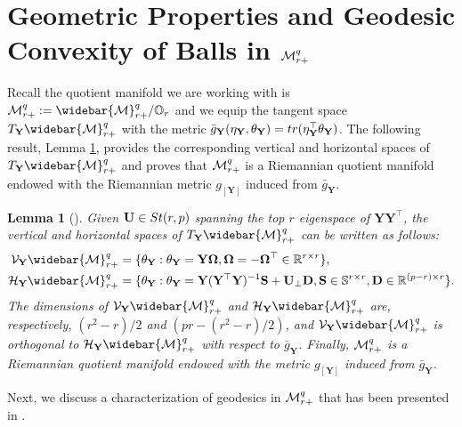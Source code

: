\documentclass[11pt]{article}
\newtheorem{Lemma}{Lemma}
\newcommand{\bbR}{\mathbb{R}}
\newcommand{\bbS}{\mathbb{S}}
\newcommand{\cV}{\mathcal{V}}
\newcommand{\cH}{\mathcal{H}}
\newcommand{\0}{{\mathbf{0}}}
\newcommand{\1}{{\mathbf{1}}}
\newcommand{\D}{{\mathbf{D}}}
\renewcommand{\S}{{\mathbf{S}}}
\newcommand{\U}{{\mathbf{U}}}
\newcommand{\Y}{{\mathbf{Y}}}
\newcommand{\cM}{{\cal M}}
\newcommand{\bOmega}{\boldsymbol{\Omega}}
\newcommand{\tr}{{\rm tr}}
\newcommand{\st}{{\rm St}}
\newcommand{\bbO}{\mathbb{O}}
\begin{document}
\section{Geometric Properties and Geodesic Convexity of Balls in $\cM_{r+}^q$ } \label{sec: quotient-fixed-rank-matrix}
Recall the quotient manifold we are working with is $\cM_{r+}^{q} := \widebar{\cM}_{r+}^{q}/\bbO_r$ and we equip the tangent space $T_\Y \widebar{\cM}_{r+}^{q}$ with the metric $\bar{g}_\Y(\eta_\Y, \theta_\Y)= \tr(\eta_\Y^\top \theta_\Y)$. The following result, Lemma \ref{lm: psd-quotient-manifold1-prop}, provides the corresponding vertical and horizontal spaces of $T_\Y \widebar{\cM}_{r+}^{q}$ and proves that $\cM_{r+}^{q}$ is a Riemannian quotient manifold endowed with the Riemannian metric $g_{[\Y]}$ induced from $\bar{g}_\Y$.
\begin{Lemma}[\cite{journee2010low,massart2020quotient}] \label{lm: psd-quotient-manifold1-prop} Given $\U \in \st(r,p)$ spanning the top $r$ eigenspace of $\Y\Y^\top$, the vertical and horizontal spaces of $T_\Y \widebar{\cM}_{r+}^{q}$ can be written as follows:
	\begin{equation*}
		\begin{split}
			\cV_\Y\widebar{\cM}_{r+}^{q}  &= \{ \theta_\Y: \theta_\Y = \Y \bOmega, \bOmega = - \bOmega^\top \in \bbR^{r \times r} \}, \\
			\cH_\Y\widebar{\cM}_{r+}^{q}  &=\{ \theta_\Y: \theta_\Y = \Y (\Y^\top \Y)^{-1} \S + \U_\perp \D, \S \in \bbS^{r \times r}, \D \in \bbR^{(p-r) \times r} \}.
		\end{split}
	\end{equation*} The dimensions of $\cV_\Y\widebar{\cM}_{r+}^{q}$ and $\cH_\Y\widebar{\cM}_{r+}^{q}$ are, respectively, $(r^2-r)/2$ and $(pr-(r^2-r)/2)$, and $\cV_\Y\widebar{\cM}_{r+}^{q}$ is orthogonal to $\cH_\Y\widebar{\cM}_{r+}^{q} $ with respect to $\bar{g}_\Y$. Finally, $\cM_{r+}^q$ is a Riemannian quotient manifold endowed with the metric $g_{[\Y]}$ induced from $\bar{g}_\Y$.
\end{Lemma}
Next, we discuss a characterization of geodesics in $\cM_{r+}^q$ that has been presented in \cite{massart2020quotient}.
\end{document}
